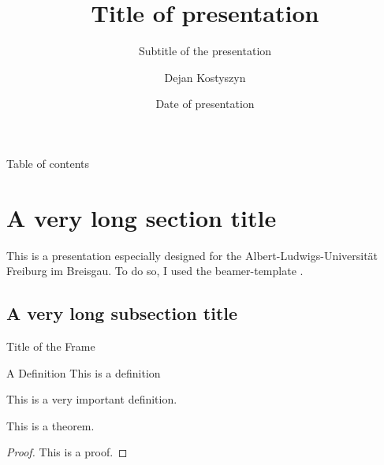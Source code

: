 


\author[Kostyszyn]{Dejan Kostyszyn}
\date{Date of presentation}
\title{Title of presentation}
\subtitle{Subtitle of the presentation}


\begin{frame}
	\titlepage
\end{frame}

\begin{frame}{Table of contents}
\tableofcontents[sectionstyle=show/show]
\end{frame}

\section[Short sec title]{A very long section title}
\begin{frame}
	This is a presentation especially designed for the Albert-Ludwigs-Universität Freiburg im Breisgau. To do so, I used the beamer-template \cite{ctan_beamer}.
\end{frame}

\subsection[Short subsec title]{A very long subsection title}
\begin{frame}{Title of the Frame}
	\begin{definition}{A Definition} This is a definition \end{definition}
	\begin{definition} This is a \alert{very important} definition. \end{definition}
    \begin{theorem} This is a theorem. \end{theorem}
    \begin{proof} This is a proof. \end{proof}
\end{frame}


